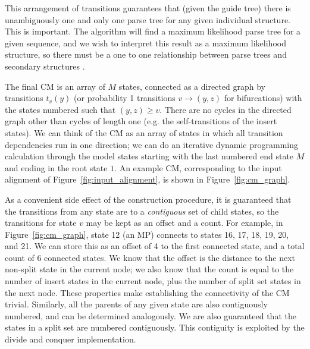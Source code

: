 This arrangement of transitions guarantees that (given the guide tree)
there is unambiguously one and only one parse tree for any given
individual structure. This is important. The algorithm will find a
maximum likelihood parse tree for a given sequence, and we wish to
interpret this result as a maximum likelihood structure, so there must
be a one to one relationship between parse trees and secondary
structures \cite{Giegerich00}.

The final CM is an array of $M$ states, connected as a directed graph
by transitions $t_v(y)$ (or probability 1 transitions $v \rightarrow
(y,z)$ for bifurcations) with the states numbered such that $(y,z)
\geq v$. There are no cycles in the directed graph other than cycles
of length one (e.g. the self-transitions of the insert states). We can
think of the CM as an array of states in which all transition
dependencies run in one direction; we can do an iterative dynamic
programming calculation through the model states starting with the
last numbered end state $M$ and ending in the root state $1$.  An
example CM, corresponding to the input alignment of
Figure~\ref{fig:input_alignment}, is shown in
Figure~\ref{fig:cm_graph}.

As a convenient side effect of the construction procedure, it is
guaranteed that the transitions from any state are to a
\emph{contiguous} set of child states, so the transitions for state
$v$ may be kept as an offset and a count. For example, in
Figure~\ref{fig:cm_graph}, state 12 (an MP) connects to states 16, 17,
18, 19, 20, and 21. We can store this as an offset of 4 to the first
connected state, and a total count of 6 connected states.  We know
that the offset is the distance to the next non-split state in the
current node; we also know that the count is equal to the number of
insert states in the current node, plus the number of split set states
in the next node. These properties make establishing the connectivity
of the CM trivial. Similarly, all the parents of any given state are
also contiguously numbered, and can be determined analogously. We are
also guaranteed that the states in a split set are numbered
contiguously.  This contiguity is exploited by the divide and conquer
implementation.

